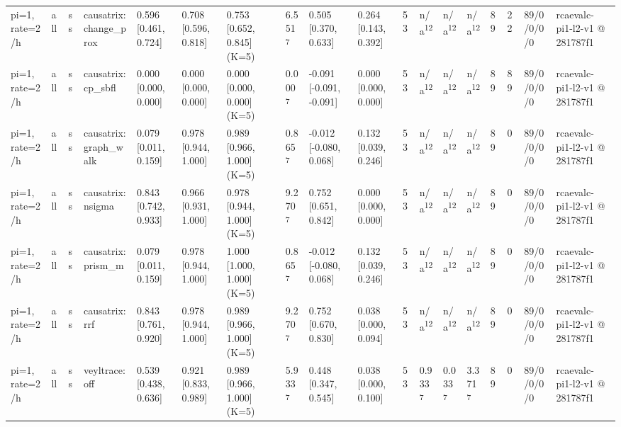 \begin{table}[t]
\begin{tabular}{llllllllllllllllll}
pi=1, rate=2/h & all & ss & causatrix:change\_prox & 0.596 [0.461, 0.724] & 0.708 [0.596, 0.818] & 0.753 [0.652, 0.845] (K=5) & 6.551\textsuperscript{7} & 0.505 [0.370, 0.633] & 0.264 [0.143, 0.392] & 53 & n/a\textsuperscript{12} & n/a\textsuperscript{12} & n/a\textsuperscript{12} & 89 & 22 & 89/0/0/0/0 & rcaevalc-pi1-l2-v1 @ 281787f1 \\
pi=1, rate=2/h & all & ss & causatrix:cp\_sbfl & 0.000 [0.000, 0.000] & 0.000 [0.000, 0.000] & 0.000 [0.000, 0.000] (K=5) & 0.000\textsuperscript{7} & -0.091 [-0.091, -0.091] & 0.000 [0.000, 0.000] & 53 & n/a\textsuperscript{12} & n/a\textsuperscript{12} & n/a\textsuperscript{12} & 89 & 89 & 89/0/0/0/0 & rcaevalc-pi1-l2-v1 @ 281787f1 \\
pi=1, rate=2/h & all & ss & causatrix:graph\_walk & 0.079 [0.011, 0.159] & 0.978 [0.944, 1.000] & 0.989 [0.966, 1.000] (K=5) & 0.865\textsuperscript{7} & -0.012 [-0.080, 0.068] & 0.132 [0.039, 0.246] & 53 & n/a\textsuperscript{12} & n/a\textsuperscript{12} & n/a\textsuperscript{12} & 89 & 0 & 89/0/0/0/0 & rcaevalc-pi1-l2-v1 @ 281787f1 \\
pi=1, rate=2/h & all & ss & causatrix:nsigma & 0.843 [0.742, 0.933] & 0.966 [0.931, 1.000] & 0.978 [0.944, 1.000] (K=5) & 9.270\textsuperscript{7} & 0.752 [0.651, 0.842] & 0.000 [0.000, 0.000] & 53 & n/a\textsuperscript{12} & n/a\textsuperscript{12} & n/a\textsuperscript{12} & 89 & 0 & 89/0/0/0/0 & rcaevalc-pi1-l2-v1 @ 281787f1 \\
pi=1, rate=2/h & all & ss & causatrix:prism\_m & 0.079 [0.011, 0.159] & 0.978 [0.944, 1.000] & 1.000 [1.000, 1.000] (K=5) & 0.865\textsuperscript{7} & -0.012 [-0.080, 0.068] & 0.132 [0.039, 0.246] & 53 & n/a\textsuperscript{12} & n/a\textsuperscript{12} & n/a\textsuperscript{12} & 89 & 0 & 89/0/0/0/0 & rcaevalc-pi1-l2-v1 @ 281787f1 \\
pi=1, rate=2/h & all & ss & causatrix:rrf & 0.843 [0.761, 0.920] & 0.978 [0.944, 1.000] & 0.989 [0.966, 1.000] (K=5) & 9.270\textsuperscript{7} & 0.752 [0.670, 0.830] & 0.038 [0.000, 0.094] & 53 & n/a\textsuperscript{12} & n/a\textsuperscript{12} & n/a\textsuperscript{12} & 89 & 0 & 89/0/0/0/0 & rcaevalc-pi1-l2-v1 @ 281787f1 \\
pi=1, rate=2/h & all & ss & veyltrace:off & 0.539 [0.438, 0.636] & 0.921 [0.833, 0.989] & 0.989 [0.966, 1.000] (K=5) & 5.933\textsuperscript{7} & 0.448 [0.347, 0.545] & 0.038 [0.000, 0.100] & 53 & 0.933\textsuperscript{7} & 0.033\textsuperscript{7} & 3.371\textsuperscript{7} & 89 & 0 & 89/0/0/0/0 & rcaevalc-pi1-l2-v1 @ 281787f1 \\

\end{tabular}
\end{table}
